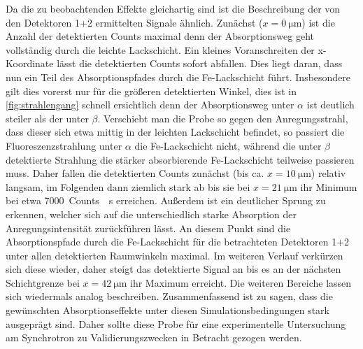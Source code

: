 Da die zu beobachtenden Effekte gleichartig sind ist die Beschreibung der von den Detektoren 1+2 ermittelten Signale ähnlich. Zunächst ($x=\SI{0}{\micro\meter}$) ist die Anzahl der detektierten Counts maximal denn der Absorptionsweg geht vollständig durch die leichte Lackschicht. Ein kleines Voranschreiten der x-Koordinate lässt die detektierten Counts sofort abfallen. Dies liegt daran, dass nun ein Teil des Absorptionspfades durch die Fe-Lackschicht führt. Insbesondere gilt dies vorerst nur für die größeren detektierten Winkel, dies ist in \cref{fig:strahlengang} schnell ersichtlich denn der Absorptionsweg unter $\alpha$ ist deutlich steiler als der unter $\beta$. Verschiebt man die Probe so gegen den Anregungsstrahl, dass dieser sich etwa mittig in der leichten Lackschicht befindet, so passiert die Fluoreszenzstrahlung unter $\alpha$ die Fe-Lackschicht nicht, während die unter $\beta$ detektierte Strahlung die stärker absorbierende Fe-Lackschicht teilweise passieren muss. Daher fallen die detektierten Counts zunächst (bis ca. $x=\SI{10}{\micro\meter}$) relativ langsam, im Folgenden dann ziemlich stark ab bis sie bei $x=\SI{21}{\micro\meter}$ ihr Minimum bei etwa \SI{7000}{Counts \per\second} erreichen. Außerdem ist ein deutlicher Sprung zu erkennen, welcher sich auf die unterschiedlich starke Absorption der Anregungsintensität zurückführen lässt. An diesem Punkt sind die Absorptionspfade durch die Fe-Lackschicht für die betrachteten Detektoren 1+2 unter allen detektierten Raumwinkeln maximal. Im weiteren Verlauf verkürzen sich diese wieder, daher steigt das detektierte Signal an bis es an der nächsten Schichtgrenze bei $x=\SI{42}{\micro\meter}$ ihr Maximum erreicht. Die weiteren Bereiche lassen sich wiedermals analog beschreiben.\newlines
Zusammenfassend ist zu sagen, dass die gewünschten Absorptionseffekte unter diesen Simulationsbedingungen stark ausgeprägt sind. Daher sollte diese Probe für eine experimentelle Untersuchung am Synchrotron zu Validierungszwecken in Betracht gezogen werden.